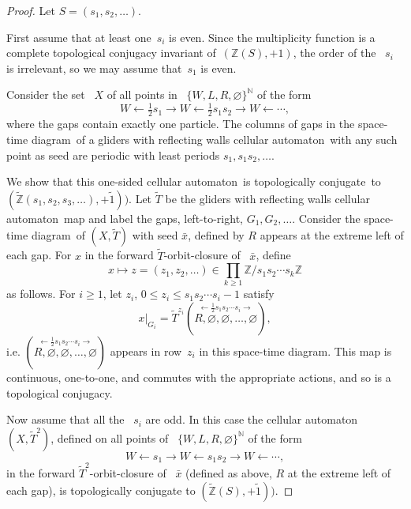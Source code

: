 \documentclass[12pt]{amsart}
\begin{document}
\begin{proof}
Let $S = (s_1,s_2,\dots)$.

First assume that at least one~$s_i$ is even.  
Since the multiplicity function is a complete topological conjugacy invariant of~$({\mathbb Z}(S),+1)$,  
the order of the ~$s_i$ is irrelevant, so we may assume that~$s_1$ is even.

Consider the set ~$X$ of all  points in
~$\{W,L,R,\varnothing\}^{\mathbb N}$  of the form
$$W\leftarrow \tfrac{1}{2}s_1 \rightarrow 
W\leftarrow \tfrac{1}{2}s_1s_2 \rightarrow 
W\leftarrow \cdots,
$$
where the gaps 
contain exactly one particle.
     The columns
     of gaps 
in the {space-time diagram}\ 
of a gliders with reflecting walls {cellular automaton}\ with  any such point as seed     
     are periodic 
 with least periods 
 $s_1,s_1s_2,\dots$.
 
 We show that 
this one-sided  {cellular automaton}\ is {topologically conjugate}\ to
$(\widetilde{\mathbb Z}(s_1,s_2,s_3,\dots),+\tilde1))$.
Let $\widetilde T$ be the gliders with reflecting walls {cellular automaton}\ map and
label the gaps, left-to-right, 
$G_1,G_2,\dots$.  Consider the {space-time diagram}\ of
$(X,\widetilde T)$ with seed $\bar x$, defined by
$R$ appears   at the extreme left of each gap.  For $x$ in the forward
$\widetilde  T$-orbit-closure of
~$\bar x$, define
$$
x \mapsto z = (z_1,z_2,\dots)
\in \prod_{k\ge1}
{\mathbb Z}/s_1s_2\cdots s_k{\mathbb Z}
$$
as follows.  For $i \ge 1$, let $z_i$, $0\le z_i \le s_1s_2\cdots s_i -1$ satisfy
$$x|_{G_i} = \widetilde T^{z_i}(\overset{\longleftarrow\frac{1}{2}s_1s_2\cdots s_i\longrightarrow}{R,\varnothing,\varnothing,\dots,\varnothing}),
$$ 
i.e. $(\overset{\longleftarrow\frac{1}{2}s_1s_2\cdots s_i\longrightarrow}{R,\varnothing,\varnothing,\dots,\varnothing})$ appears in row~$z_i$ in this {space-time diagram}. 
This map is continuous, one-to-one, and commutes with the appropriate actions, and so is a topological conjugacy.

Now assume that all the ~$s_i$ are odd.
In this case the   {cellular automaton}\ $(X,\widetilde T^2)$, defined on all points of
~$\{W,L,R,\varnothing\}^{\mathbb N}$  
of the form
$$ W\leftarrow s_1 \rightarrow 
W\leftarrow s_1s_2 \rightarrow 
W\leftarrow \cdots,
$$
in the forward
$\widetilde  T^2$-orbit-closure of
~$\bar x$ (defined as above, $R$ at the extreme left of each gap), 
is topologically conjugate to
$(\widetilde{\mathbb Z}(S),+\tilde1))$.
\end{proof}

 
\end{document}
